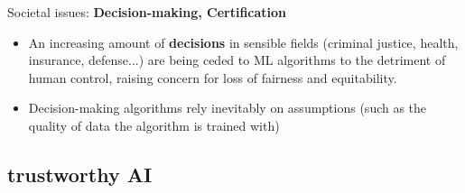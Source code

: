 \documentclass[10pt,serif,mathserif,compress,hyperref={colorlinks}]{beamer}
\begin{document}
\begin{frame}{Societal issues: {\bf Decision-making, Certification}}

  
  
  \begin{tcolorbox}[title={\bf Decision-making}]
    \begin{itemize}
    \item An increasing amount of {\bf decisions} in sensible fields (criminal justice, health, insurance, defense...) are being ceded to ML algorithms to the detriment of
  human control, raising concern for loss of fairness and equitability.
    \item Decision-making algorithms rely inevitably on assumptions (such as the quality of data the algorithm is trained with)
    \end{itemize}
  \end{tcolorbox}   

    
\end{frame}

\subsection{trustworthy AI}
\end{document}
